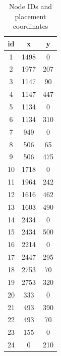 \documentclass[
  print, %
  Table,   %
  nolof,     %
  nolot,     %
           oneside
]{fithesis3}
\begin{document}
\begin{table}[h!!!]
  \begin{tabularx}{120px}{c|cc}

id &    x &    y\\
 \hline
1 &    1498 &    0\\
2 &    1977 &    207\\
3 &    1147 &    90\\
4 &    1147 &    447\\
5 &    1134 &    0\\
6 &    1134 &    310\\
7 &    949 &    0\\
8 &    506 &    65\\
9 &    506 &    475\\
10 &    1718 &    0\\
11 &    1964 &    242\\
12 &    1616 &    462\\
13 &    1603 &    490\\
14 &    2434 &    0\\
15 &    2434 &    500\\
16 &    2214 &    0\\
17 &    2447 &    295\\
18 &    2753 &    70\\
19 &    2753 &    320\\
20 &    333 &    0\\
21 &    493 &    390\\
22 &    493 &    70\\
23 &    155 &    0\\
24 &    0 &    210\\


\end{tabularx}
\caption[Node IDs and placement coordinates]{Node IDs and placement coordinates\protect\footnotemark}

\label{tab:map}
\end{table}
\end{document}
